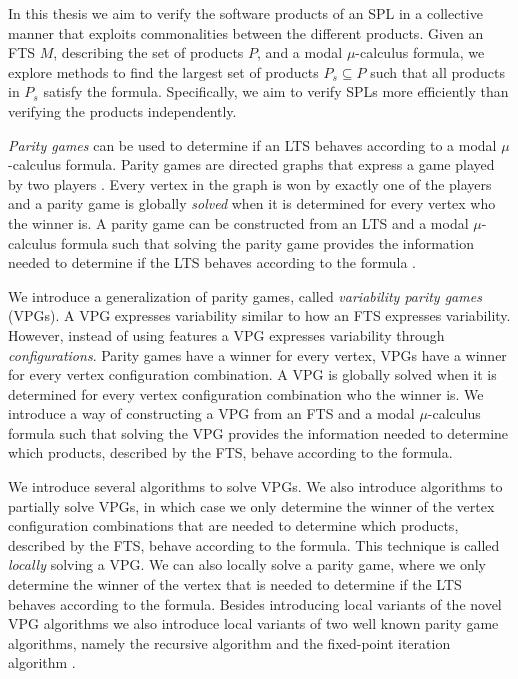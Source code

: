 In this thesis we aim to verify the software products of an SPL in a collective manner that exploits commonalities between the different products. Given an FTS $M$, describing the set of products $P$, and a modal $\mu$-calculus formula, we explore methods to find the largest set of products $P_s \subseteq P$ such that all products in $P_s$ satisfy the formula. Specifically, we aim to verify SPLs more efficiently than verifying the products independently.

\textit{Parity games} can be used to determine if an LTS behaves according to a modal $\mu$-calculus formula. Parity games are directed graphs that express a game played by two players \cite{Bradfield2018}. Every vertex in the graph is won by exactly one of the players and a parity game is globally \textit{solved} when it is determined for every vertex who the winner is. A parity game can be constructed from an LTS and a modal $\mu$-calculus formula such that solving the parity game provides the information needed to determine if the LTS behaves according to the formula \cite{Bradfield2018}.

We introduce a generalization of parity games, called \textit{variability parity games} (VPGs). A VPG expresses variability similar to how an FTS expresses variability. However, instead of using features a VPG expresses variability through \textit{configurations}. Parity games have a winner for every vertex, VPGs have a winner for every vertex configuration combination. A VPG is globally solved when it is determined for every vertex configuration combination who the winner is. We introduce a way of constructing a VPG from an FTS and a modal $\mu$-calculus formula such that solving the VPG provides the information needed to determine which products, described by the FTS, behave according to the formula.

We introduce several algorithms to solve VPGs. We also introduce algorithms to partially solve VPGs, in which case we only determine the winner of the vertex configuration combinations that are needed to determine which products, described by the FTS, behave according to the formula. This technique is called \textit{locally} solving a VPG. We can also locally solve a parity game, where we only determine the winner of the vertex that is needed to determine if the LTS behaves according to the formula. Besides introducing local variants of the novel VPG algorithms we also introduce local variants of two well known parity game algorithms, namely the recursive algorithm \cite{ZIELONKA1998135,MCNAUGHTON1993149} and the fixed-point iteration algorithm \cite{WALUKIEWICZ2002311,FPITE}.

